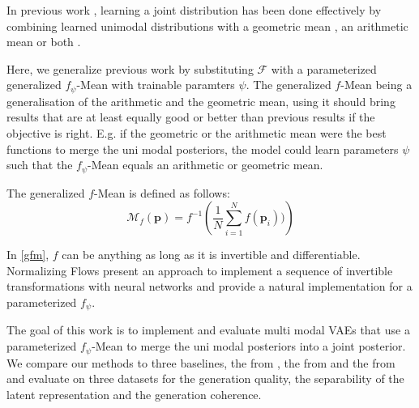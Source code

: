 In previous work \parencite{poe,shi_variational_2019,sutter_generalized_2020}, learning a joint distribution has been done effectively by combining learned unimodal distributions with a geometric mean \parencite{poe}, an arithmetic mean \parencite{shi_variational_2019} or both \parencite{sutter_generalized_2020}.


Here, we generalize previous work by substituting $\mathcal{F}$ with a parameterized generalized $f_{\psi}$-Mean \parencite{niculescu_convex_2018} with trainable paramters $\psi$.
The generalized $f$-Mean being a generalisation of the arithmetic and the geometric mean, using it should bring results that are at least equally good or better than previous results if the objective is right.
E.g. if the geometric or the arithmetic mean were the best functions to merge the uni modal posteriors, the model could learn parameters $\psi$ such that the $f_{\psi}$-Mean equals an arithmetic or geometric mean.

The generalized $f$-Mean is defined as follows:
\begin{equation}
    \label{gfm}
    \mathcal{M}_{f}\left( \textbf{p} \right) = f^{-1}\left( \frac{1}{N} \sum ^N _{i=1} f(\textbf{p}_i)) \right)
\end{equation}

In \cref{gfm}, $f$ can be anything as long as it is invertible and differentiable.
Normalizing Flows \parencite{papamakarios_normalizing_2019} present an approach to implement a sequence of invertible transformations with neural networks and provide a natural implementation for a parameterized $f_{\psi}$.




\bigskip
The goal of this work is to implement and evaluate multi modal VAEs that use a parameterized $f_{\psi}$-Mean to merge the uni modal posteriors into a joint posterior.
We compare our methods to three baselines, the  from \cite{poe}, the  from \cite{shi2019variational} and the  from \cite{thomas_gener-ELBO} and evaluate on three datasets for the generation quality, the separability of the latent representation and the generation coherence.

\vspace{3cm}

